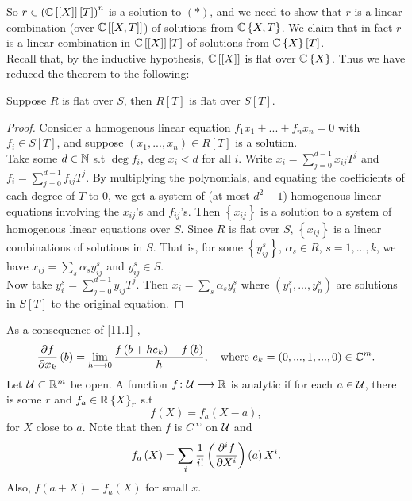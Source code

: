 So $r\in\left(\mathbb{C}\left[\left[X\right]\right]\left[T\right]\right)^{n}$
is a solution to $\left(\ast\right)$, and we need to show that $r$
is a linear combination (over $\mathbb{C}\left[\left[X,T\right]\right]$)
of solutions from $\mathbb{C}\left\{ X,T\right\} $. We claim that in fact
$r$ is a linear combination in $\mathbb{C}\left[\left[X\right]\right]\left[T\right]$
of solutions from $\mathbb{C}\left\{ X\right\} \left[T\right]$. \\
Recall that, by the inductive hypothesis, $\mathbb{C}\left[\left[X\right]\right]$
is flat over $\mathbb{C}\left\{ X\right\} $. Thus we have reduced the theorem
to the following:
\begin{prop*}
Suppose $R$ is flat over $S$, then $R\left[T\right]$ is flat over
$S\left[T\right]$.\end{prop*}
\begin{proof}
Consider a homogenous linear equation $f_{1}x_{1}+...+f_{n}x_{n}=0$
with $f_{i}\in S\left[T\right]$, and suppose $\left(x_{1},...,x_{n}\right)\in R\left[T\right]$
is a solution. \\
Take some $d\in\mathbb{N}$ s.t $\deg f_{i},\deg x_{i}<d$ for all $i$. Write
$x_{i}=\sum_{j=0}^{d-1}x_{ij}T^{j}$ and $f_{i}=\sum_{j=0}^{d-1}f_{ij}T^{j}$.
By multiplying the polynomials, and equating the coefficients of each
degree of $T$ to $0$, we get a system of (at most $d^{2}-1$) homogenous
linear equations involving the $x_{ij}$'s and $f_{ij}$'s. Then $\left\{ x_{ij}\right\} $
is a solution to a system of homogenous linear equations over $S$.
Since $R$ is flat over $S$, $\left\{ x_{ij}\right\} $ is a linear
combinations of solutions in $S$. That is, for some $\left\{ y_{ij}^{s}\right\} $,
$\alpha_{s}\in R$, $s=1,...,k$, we have $x_{ij}=\sum_{s}\alpha_{s}y_{ij}^{s}$
and $y_{ij}^{s}\in S$.\\
Now take $y_{i}^{s}=\sum_{j=0}^{d-1}y_{ij}T^{j}$. Then $x_{i}=\sum_{s}\alpha_{s}y_{i}^{s}$
where $\left(y_{1}^{s},...,y_{n}^{s}\right)$ are solutions in $S\left[T\right]$
to the original equation.
\end{proof}

As a consequence of \ref{11.1} , 
\[
\frac{\partial f}{\partial x_{k}}\left(b\right)=\lim_{h\longrightarrow0}\frac{f\left(b+he_{k}\right)-f\left(b\right)}{h},\quad\textrm{where }e_{k}=\left(0,...,1,...,0\right)\in\mathbb{C}^{m}.
\]
Let $\mathcal{U}\subset\mathbb{R}^{m}$ be open. A function $f\colon\mathcal{U}\longrightarrow\mathbb{R}$ is analytic
if for each $a\in\mathcal{U}$, there is some $r$ and $f_{a}\in\mathbb{R}\left\{ X\right\} _{r}$
s.t 
\[
f\left(X\right)=f_{a}\left(X-a\right),
\]
for $X$ close to $a$. Note that then $f$ is $C^{\infty}$ on $\mathcal{U}$
and 
\[
f_{a}\left(X\right)=\sum_{i}\frac{1}{i!}\left(\frac{\partial^{i}f}{\partial X^{i}}\right)\left(a\right)X^{i}.
\]
Also, $f\left(a+X\right)=f_{a}\left(X\right)$ for small $x$.

